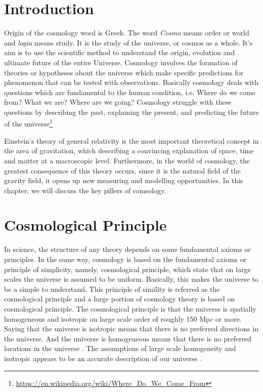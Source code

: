 \documentclass[12pt]{report}
\begin{document}
\section{Introduction}
Origin of the cosmology word is Greek. The word \textit{Cosmo} means  order or world and \textit{logia} means study. It is the study of the universe, or cosmos as a whole. It's aim is to use the scientific method to understand the origin, evolution and ultimate future of the entire Universe. Cosmology involves the formation of theories or hypotheses about the universe which make specific predictions for phenomenon that can be tested with observations. Basically cosmology deals with questions which are fundamental to the human condition, i.e. Where do we come from? What we are? Where are we going? Cosmology struggle with these questions by describing the past, explaining the present, and predicting the future of the universe\footnote{\url{https://en.wikipedia.org/wiki/Where_Do_We_Come_From}}

Einstein's theory of general relativity is the most important theoretical concept in the area of gravitation, which describing a convincing explanation of space, time and matter at a macroscopic level. Furthermore, in the world of cosmology, the greatest consequence of this theory occurs, since it is the natural field of the gravity field, it opens up new measuring and modelling opportunities. In this chapter, we will discuss the key pillers of comsology.


\section{Cosmological Principle}
In science, the structure of any theory depends on some fundamental axioms or principles. In the same way, cosmology is based on the fundamental axioms or principle of simplicity, namely, cosmological principle, which state that on large scales the universe is assumed to be uniform. Basically, this makes the universe to be a simple to understand. This principle of simility is referred as the cosmological principle and a large portion of cosmology theory is based on cosmological principle. The cosmological principle is that the universe is spatially homogeneous and isotropic on large scale order of roughly 150 Mpc or more. Saying that the universe is isotropic means that there is no preferred directions in the universe. And the universe is homogeneous means that there is no preferred locations in the universe \cite{rk2000}. The assumptions of large scale homogeneity and isotropic appears to be an accurate description of our universe \cite{jc2014}.\\
\end{document}
